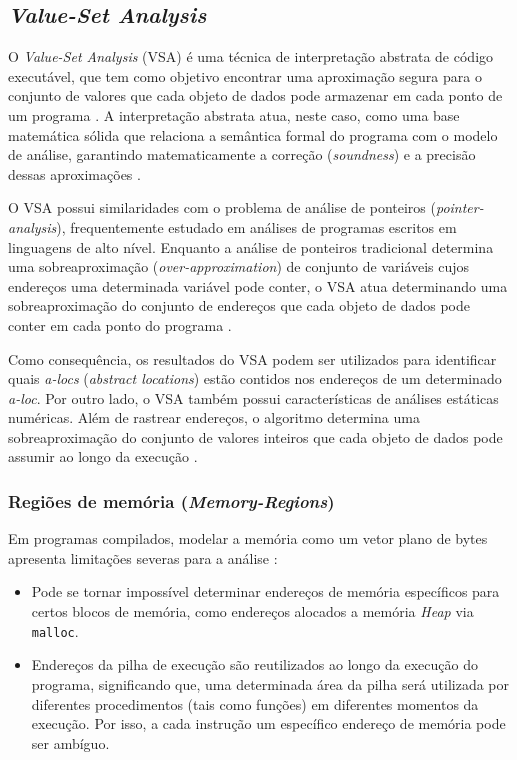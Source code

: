 \documentclass[
    12pt,                %
    openright,           %
    oneside,             %
    a4paper,             %
    english,             %
    brazil               %
]{abntex2}
\begin{document}
\subsection{\textit{Value-Set Analysis}}
\label{subsec:VSA}

O \textit{Value-Set Analysis} (VSA) é uma técnica de interpretação abstrata de código executável, que tem como objetivo encontrar uma aproximação segura para o conjunto de valores que cada objeto de 
dados pode armazenar em cada ponto de um programa \cite{Balakrishnan2007}. A interpretação abstrata atua, neste caso, como uma base matemática sólida que relaciona a semântica formal do programa com o modelo de análise, 
garantindo matematicamente a correção (\textit{soundness}) e a precisão dessas aproximações \cite{spa}.

\par
O VSA possui similaridades com o problema de análise de ponteiros (\textit{pointer-analysis}), frequentemente estudado em análises de 
programas escritos em linguagens de alto nível. Enquanto a análise de ponteiros tradicional determina uma sobreaproximação (\textit{over-approximation}) de conjunto de variáveis cujos endereços uma determinada variável 
pode conter, o VSA atua determinando uma sobreaproximação do conjunto de endereços que cada objeto de dados pode conter em cada ponto do programa \cite{Balakrishnan2007}. 
\par
Como consequência, os resultados do VSA podem ser utilizados para 
identificar quais \textit{a-locs} (\textit{abstract locations}) estão contidos nos endereços de um determinado \textit{a-loc}. Por outro lado, o VSA também possui características de análises estáticas numéricas. Além de rastrear endereços, 
o algoritmo determina uma sobreaproximação do conjunto de valores inteiros que cada objeto de dados pode assumir ao longo da execução \cite{Balakrishnan2007}.

\subsubsection{Regiões de memória (\textit{Memory-Regions})}

Em programas compilados, modelar a memória como um vetor plano de bytes apresenta limitações severas para a análise \cite{Balakrishnan2007}:
\begin{itemize}
\item 
Pode se tornar impossível determinar endereços de memória específicos para certos blocos de memória, como endereços alocados a memória \textit{Heap} via \texttt{malloc}. 

\item
Endereços da pilha de execução são reutilizados ao longo da execução do programa, significando que, uma determinada área da pilha será utilizada por diferentes procedimentos (tais como funções) em diferentes momentos da execução. Por isso, a cada instrução um específico endereço de memória pode ser ambíguo.
\end{itemize}
\end{document}
